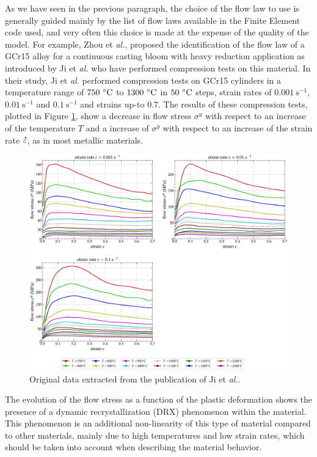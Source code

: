 \documentclass[algorithms,article,submit,pdftex,moreauthors]{Definitions/mdpi}
\makeatletter
\DeclareRobustCommand{\mdot}[1]{\accentset{\mbox{\bfseries .}}{#1}}
\DeclareRobustCommand{\eal}{et \emph{al.}\@\xspace}
\DeclareRobustCommand{\ps}{\text{s}^{-1}}
\makeatother
\begin{document}
As we have seen in the previous paragraph, the choice of the flow law to use is generally guided mainly by the list of flow laws available in the Finite Element code used, and very often this choice is made at the expense of the quality of the model.
For example, Zhou \eal \cite{Zhou-2020}, proposed the identification of the flow law of a GCr15 alloy for a continuous casting bloom with heavy reduction application as introduced by Ji \eal \cite{Ji-2018} who have performed compression tests on this material.
In their study, Ji \eal \cite{Ji-2018} performed compression tests on GCr15 cylinders in a temperature range of $750~\celsius$ to $1300~\celsius$ in $50~\celsius$ steps, strain rates of $0.001~\ps$,  $0.01~\ps$ and $0.1~\ps$ and strains up-to $0.7$.
The results of these compression tests, plotted in Figure \ref{fig:Zhou-OriginalData}, show a decrease in flow stress $\sigma^y$ with respect to an increase of the temperature $T$ and a increase of $\sigma^y$ with respect to an increase of the strain rate $\mdot\varepsilon$, as in most metallic materials.
\begin{figure}[!ht]
\centering
\includegraphics[width=0.9\columnwidth]{Figures/Zhou-OriginalData}
\caption{Original data extracted from the publication of Ji \eal \cite{Ji-2018}.}
\label{fig:Zhou-OriginalData}
\end{figure}
The evolution of the flow stress as a function of the plastic deformation shows the presence of a dynamic recrystallization (DRX) phenomenon within the material.
This phenomenon is an additional non-linearity of this type of material compared to other materials, mainly due to high temperatures and low strain rates, which should be taken into account when describing the material behavior.
\end{document}
